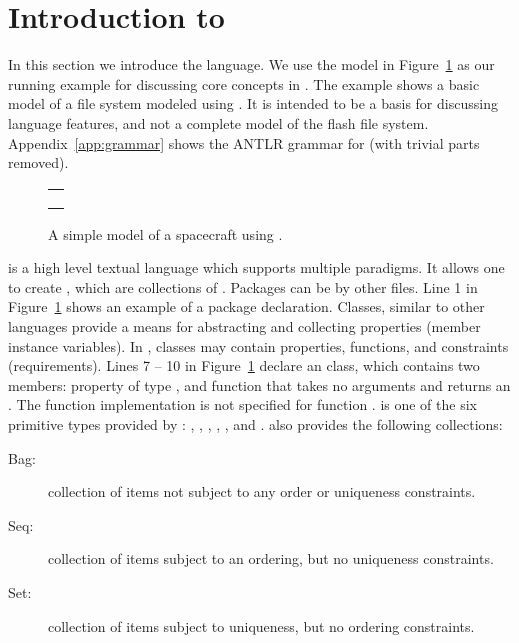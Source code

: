\section{Introduction to \Klang{}}
\label{sec:k-syntax}

In this section we introduce the \Klang{} language. We use the
\Klang{} model in Figure~\ref{fig:fs} as our running example for
discussing core concepts in \Klang{}. The example shows a basic model
of a file system modeled using \Klang{}. It is intended to be a
basis for discussing language features, and not a complete model of
the flash file system. Appendix~\ref{app:grammar} shows the ANTLR
grammar for \Klang{} (with trivial parts removed).

\begin{figure}
\centering
\begin{tabular}{c}
\hline \\
 \\ \\
\hline
\end{tabular}
\caption{A simple model of a spacecraft using \Klang{}.}
\label{fig:fs}
\end{figure}

\Klang{} is a high level textual language which supports multiple
paradigms. It allows one to create , which are
collections of . Packages can be  by
other \Klang{} files. Line 1 in Figure~\ref{fig:fs} shows an example
of a package declaration. Classes, similar to other languages provide
a means for abstracting and collecting properties (member instance
variables). In \Klang{}, classes may contain properties, functions, and
constraints (requirements). Lines 7 -- 10 in Figure~\ref{fig:fs}
declare an  class, which contains two members: property
 of type , and function  that takes
no arguments and returns an . The function implementation is
not specified for function .  is one of the
six primitive types provided by \Klang{}: , ,
, , , and . \Klang{}
also provides the following collections:

\begin{description}
\item [Bag:] collection of items not subject to any order
  or uniqueness constraints.
\item [Seq:] collection of items subject to an ordering, but
  no uniqueness constraints.
\item [Set:] collection of items subject to uniqueness, but no
  ordering constraints.
\end{description}

